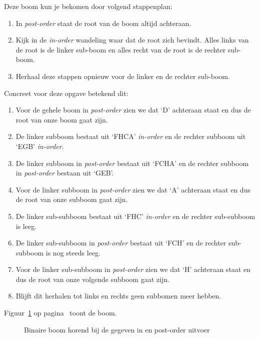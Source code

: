 \begin{Oplossing}{4.8}

Deze boom kun je bekomen door volgend stappenplan:
\begin{enumerate}
	\item In \emph{post-order} staat de root van de boom altijd achteraan.
	\item Kijk in de \emph{in-order} wandeling waar dat de root zich bevindt. Alles links van de root is de linker sub-boom en alles recht van de root is de rechter sub-boom.
	\item Herhaal deze stappen opnieuw voor de linker en de rechter sub-boom.
\end{enumerate}

Concreet voor deze opgave betekend dit:
\begin{enumerate}
	\item Voor de gehele boom in \emph{post-order} zien we dat ‘D’ achteraan staat en dus de root van onze boom gaat zijn.
	\item De linker subboom bestaat uit ‘FHCA’ \emph{in-order} en de rechter subboom uit ‘EGB’ \emph{in-order}.
	\item De linker subboom in \emph{post-order} bestaat uit ‘FCHA’ en de rechter subboom in \emph{post-order} bestaan uit ‘GEB’.
	\item Voor de linker subboom in \emph{post-order} zien we dat ‘A’ achteraan staat en dus de root van onze subboom gaat zijn.
	\item De linker sub-subboom bestaat uit ‘FHC’ \emph{in-order} en de rechter sub-subboom is leeg.
	\item De linker sub-subboom in \emph{post-order} bestaat uit ‘FCH’ en de rechter sub-subboom is nog steeds leeg.
	\item Voor de linker sub-subboom in \emph{post-order} zien we dat ‘H’ achteraan staat en dus de root van onze volgende subboom gaat zijn.
	\item Blijft dit herhalen tot links en rechts geen subbomen meer hebben.
\end{enumerate}
Figuur~\ref{fig:exjuni19inpost} op pagina~\pageref{fig:exjuni19inpost} toont de boom.
\begin{figure}[htbp]
    \centering
{}
\caption{Binaire boom horend bij de gegeven in en post-order uitvoer}
    \label{fig:exjuni19inpost}
\end{figure}
\end{Oplossing}
